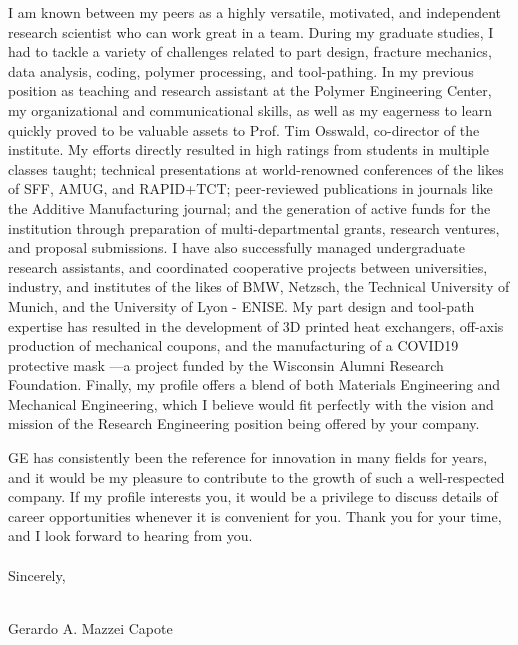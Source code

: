 \documentclass[12pt,letterpaper]{article}
\begin{document}
I am known between my peers as a highly versatile, motivated, and independent research scientist who can work great in a team. During my graduate studies, I had to tackle a variety of challenges related to part design, fracture mechanics, data analysis, coding, polymer processing, and tool-pathing. In my previous position as teaching and research assistant at the Polymer Engineering Center, my organizational and communicational skills, as well as my eagerness to learn quickly proved to be valuable assets to Prof. Tim Osswald, co-director of the institute. My efforts directly resulted in high ratings from students in multiple classes taught; technical presentations at world-renowned conferences of the likes of SFF, AMUG, and RAPID+TCT; peer-reviewed publications in journals like the Additive Manufacturing journal; and the generation of active funds for the institution through preparation of multi-departmental grants, research ventures, and proposal submissions. I have also successfully managed undergraduate research assistants, and coordinated cooperative projects between universities, industry, and institutes of the likes of BMW, Netzsch, the Technical University of Munich, and the University of Lyon - ENISE. My part design and tool-path expertise has resulted in the development of 3D printed heat exchangers, off-axis production of mechanical coupons, and the manufacturing of a COVID19 protective mask ---a project funded by the Wisconsin Alumni Research Foundation. Finally, my profile offers a blend of both Materials Engineering and Mechanical Engineering, which I believe would fit perfectly with the vision and mission of the Research Engineering position being offered by your company.

GE has consistently been the reference for innovation in many fields for years, and it would be my pleasure to contribute to the growth of such a well-respected company. If my profile interests you, it would be a privilege to discuss details of career opportunities whenever it is convenient for you. Thank you for your time, and I look forward to hearing from you.
\\
\\
Sincerely,
\\
\\
\begin{center}
Gerardo A. Mazzei Capote
\end{center}
\end{document}
